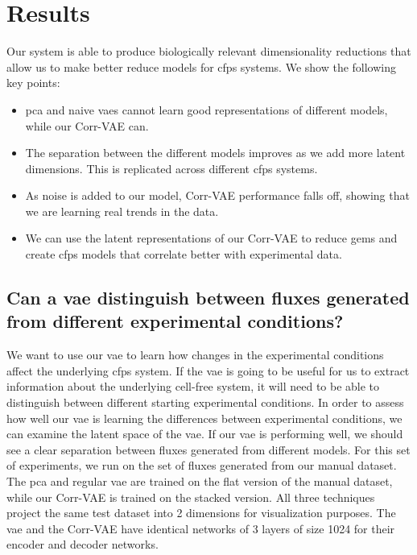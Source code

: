\chapter{Results}\label{chap:res}
Our system is able to produce biologically relevant dimensionality reductions that allow us to make better reduce models for \gls{cfps} systems.
We show the following key points:
\begin{itemize}
\item \gls{pca} and naive \glspl{vae} cannot learn good representations of different models, while our Corr-VAE can.
\item The separation between the different models improves as we add more latent dimensions.
This is replicated across different \gls{cfps} systems.
\item As noise is added to our model, Corr-VAE performance falls off, showing that we are learning real trends in the data.
\item We can use the latent representations of our Corr-VAE to reduce \glspl{gem} and create \gls{cfps} models that correlate better with experimental data.
\end{itemize}



\section{Can a \gls{vae} distinguish between fluxes generated from different experimental conditions?}
We want to use our \gls{vae} to learn how changes in the experimental conditions affect the underlying \gls{cfps} system.
If the \gls{vae} is going to be useful for us to extract information about the underlying cell-free system, it will need to be able to distinguish between different starting experimental conditions.
In order to assess how well our \gls{vae} is learning the differences between experimental conditions, we can examine the latent space of the \gls{vae}.
If our \gls{vae} is performing well, we should see a clear separation between fluxes generated from different models.
For this set of experiments, we run on the set of fluxes generated from our manual dataset.
The \gls{pca} and regular \gls{vae} are trained on the flat version of the manual dataset, while our Corr-VAE is trained on the stacked version.
All three techniques project the same test dataset into 2 dimensions for visualization purposes.
The \gls{vae} and the Corr-VAE have identical networks of 3 layers of size 1024 for their encoder and decoder networks.

